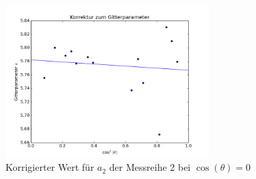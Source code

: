 \begin{figure}[hb]
 \includegraphics[width=0.7\textwidth]{../auswertung/a2.png}
 \caption{Korrigierter Wert für $a_2$ der Messreihe 2 bei $\cos(\theta)=0$}
 \label{pic:fita2}
\end{figure}







